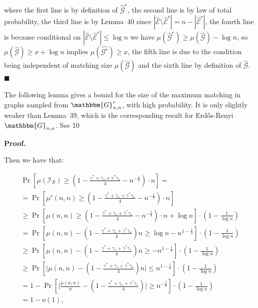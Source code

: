where the first line is by definition of $\hat{\mathcal{G}}^{r}$, the second line is by law of total probability, the third line is by Lemma 40 since $|\hat{\mathcal{E}}\setminus\hat{\mathcal{E}}^{r}|=n-|\hat{\mathcal{E}}^{r}|$, the fourth line is because conditional on $|\hat{\mathcal{E}}\setminus\hat{\mathcal{E}}^{r}|\leq\log{n}$ we have $\mu(\hat{\mathcal{G}}^{r})\geq\mu(\hat{\mathcal{G}})-\log{n}$, so $\mu(\hat{\mathcal{G}})\geq x+\log{n}$ implies $\mu(\hat{\mathcal{G}^{r}})\geq x$, the fifth line is due to the condition being independent of matching size $\mu(\hat{\mathcal{G}})$ and the sixth line by definition of $\hat{\mathcal{G}}$.
\ensuremath{\blacksquare}\par





The following lemma gives a bound for the size of the maximum matching in graphs sampled from $\mathbbm{G}^{r}_{n,n}$, with high probability. It is only slightly weaker than Lemma 39, which is the corresponding result for Erdős-Renyi $\mathbbm{G}_{n,n}$.
See 10\par




\par\medskip\noindent\textbf{Proof.}\par



Then we have that:\par


\[\begin{gathered}
\displaystyle\Pr \displaystyle\left[\mu(\mathcal{I}_{\mathcal{B}})\geq\left(1-\frac{\gamma^{*}+\gamma_{*}+\gamma^{*}\gamma_{*}}{4}-n^{-\frac{1}{9}}\right)\cdot n\right]= \\
\displaystyle=\Pr\left[\mu^{r}(n,n)\geq\left(1-\frac{\gamma^{*}+\gamma_{*}+\gamma^{*}\gamma_{*}}{4}-n^{-\frac{1}{9}}\right)\cdot n\right] \\
\displaystyle\geq\Pr\left[\mu(n,n)\geq\left(1-\frac{\gamma^{*}+\gamma_{*}+\gamma^{*}\gamma_{*}}{4}-n^{-\frac{1}{9}}\right)\cdot n+\log{n}\right]\cdot\left(1-\frac{1}{\log{n}}\right) \\
\displaystyle=\Pr\left[\mu(n,n)-\left(1-\frac{\gamma^{*}+\gamma_{*}+\gamma^{*}\gamma_{*}}{4}\right)n\geq\log{n}-n^{1-\frac{1}{9}}\right]\cdot\left(1-\frac{1}{\log{n}}\right) \\
\displaystyle\geq\Pr\left[\mu(n,n)-\left(1-\frac{\gamma^{*}+\gamma_{*}+\gamma^{*}\gamma_{*}}{4}\right)n\geq-n^{1-\frac{1}{8}}\right]\cdot\left(1-\frac{1}{\log{n}}\right) \\
\displaystyle\geq\Pr\left[\big|\mu(n,n)-\left(1-\frac{\gamma^{*}+\gamma_{*}+\gamma^{*}\gamma_{*}}{4}\right)n\big|\leq n^{1-\frac{1}{8}}\right]\cdot\left(1-\frac{1}{\log{n}}\right) \\
\displaystyle=1-\Pr\left[\big|\frac{\mu(n,n)}{n}-\left(1-\frac{\gamma^{*}+\gamma_{*}+\gamma^{*}\gamma_{*}}{4}\right)\big|\geq n^{-\frac{1}{8}}\right]\cdot\left(1-\frac{1}{\log{n}}\right) \\
\displaystyle=1-o(1),
\end{gathered}\]


